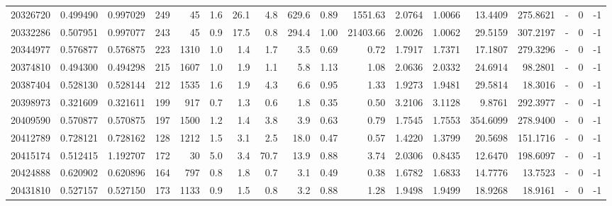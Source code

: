 \begin{tabular}{rrrrrrrrrrrrrrrlrr}
  20326720 & 0.499490 &   0.997029 &  249 &   45 &      1.6 &     26.1 &     4.8 &    629.6 &       0.89 &     1551.63 &  2.0764 &  1.0066 &   13.4409 &  275.8621 &             - &        0 &         -1 \\
  20332286 & 0.507951 &   0.997077 &  243 &   45 &      0.9 &     17.5 &     0.8 &    294.4 &       1.00 &    21403.66 &  2.0026 &  1.0062 &   29.5159 &  307.2197 &             - &        0 &         -1 \\
  20344977 & 0.576877 &   0.576875 &  223 & 1310 &      1.0 &      1.4 &     1.7 &      3.5 &       0.69 &        0.72 &  1.7917 &  1.7371 &   17.1807 &  279.3296 &             - &        0 &         -1 \\
  20374810 & 0.494300 &   0.494298 &  215 & 1607 &      1.0 &      1.9 &     1.1 &      5.8 &       1.13 &        1.08 &  2.0636 &  2.0332 &   24.6914 &   98.2801 &             - &        0 &         -1 \\
  20387404 & 0.528130 &   0.528144 &  212 & 1535 &      1.6 &      1.9 &     4.3 &      6.6 &       0.95 &        1.33 &  1.9273 &  1.9481 &   29.5814 &   18.3016 &             - &        0 &         -1 \\
  20398973 & 0.321609 &   0.321611 &  199 &  917 &      0.7 &      1.3 &     0.6 &      1.8 &       0.35 &        0.50 &  3.2106 &  3.1128 &    9.8761 &  292.3977 &             - &        0 &         -1 \\
  20409590 & 0.570877 &   0.570875 &  197 & 1500 &      1.2 &      1.4 &     3.8 &      3.9 &       0.63 &        0.79 &  1.7545 &  1.7553 &  354.6099 &  278.9400 &             - &        0 &         -1 \\
  20412789 & 0.728121 &   0.728162 &  128 & 1212 &      1.5 &      3.1 &     2.5 &     18.0 &       0.47 &        0.57 &  1.4220 &  1.3799 &   20.5698 &  151.1716 &             - &        0 &         -1 \\
  20415174 & 0.512415 &   1.192707 &  172 &   30 &      5.0 &      3.4 &    70.7 &     13.9 &       0.88 &        3.74 &  2.0306 &  0.8435 &   12.6470 &  198.6097 &             - &        0 &         -1 \\
  20424888 & 0.620902 &   0.620896 &  164 &  797 &      0.8 &      1.8 &     0.7 &      3.1 &       0.49 &        0.38 &  1.6782 &  1.6833 &   14.7776 &   13.7523 &             - &        0 &         -1 \\
  20431810 & 0.527157 &   0.527150 &  173 & 1133 &      0.9 &      1.5 &     0.8 &      3.2 &       0.88 &        1.28 &  1.9498 &  1.9499 &   18.9268 &   18.9161 &             - &        0 &         -1 \\

\end{tabular}
